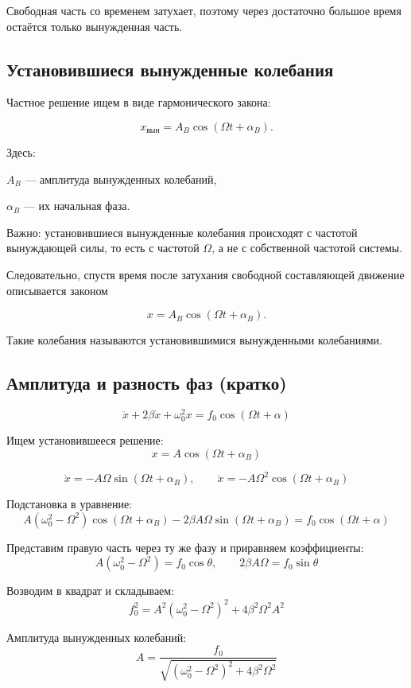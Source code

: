 \documentclass[a4paper,12pt]{article}
\begin{document}
Свободная часть со временем затухает, поэтому через достаточно большое время остаётся только вынужденная часть.

\subsection*{Установившиеся вынужденные колебания}

Частное решение ищем в виде гармонического закона:

\[
x_{\text{вын}}=A_{B}\cos(\Omega t+\alpha_{B}).
\]

Здесь:

$A_{B}$ — амплитуда вынужденных колебаний,

$\alpha_{B}$ — их начальная фаза.

Важно: установившиеся вынужденные колебания происходят с частотой вынуждающей силы, то есть с частотой $\Omega$, а не с собственной частотой системы.

Следовательно, спустя время после затухания свободной составляющей движение описывается законом

\[
x=A_{B}\cos(\Omega t+\alpha_{B}).
\]

\begin{definitionbox}
Такие колебания называются установившимися вынужденными колебаниями.
\end{definitionbox}

\subsection*{Амплитуда и разность фаз (кратко)}

\[
\ddot x + 2\beta \dot x + \omega_0^2 x = f_0 \cos(\Omega t + \alpha)
\]

Ищем установившееся решение:
\[
x = A \cos(\Omega t + \alpha_B)
\]

\[
\dot x = -A\Omega \sin(\Omega t + \alpha_B),
\qquad
\ddot x = -A\Omega^2 \cos(\Omega t + \alpha_B)
\]

Подстановка в уравнение:
\[
A(\omega_0^2-\Omega^2)\cos(\Omega t+\alpha_B)
-2\beta A\Omega \sin(\Omega t+\alpha_B)
=
f_0 \cos(\Omega t+\alpha)
\]

Представим правую часть через ту же фазу и приравняем коэффициенты:
\[
A(\omega_0^2-\Omega^2)=f_0\cos\theta,
\qquad
2\beta A\Omega=f_0\sin\theta
\]

Возводим в квадрат и складываем:
\[
f_0^2 =
A^2(\omega_0^2-\Omega^2)^2
+
4\beta^2\Omega^2 A^2
\]

\begin{definitionbox}
Амплитуда вынужденных колебаний:
\[
A =
\frac{f_0}{\sqrt{(\omega_0^2-\Omega^2)^2 + 4\beta^2 \Omega^2}}
\]
\end{definitionbox}   
\end{document}
